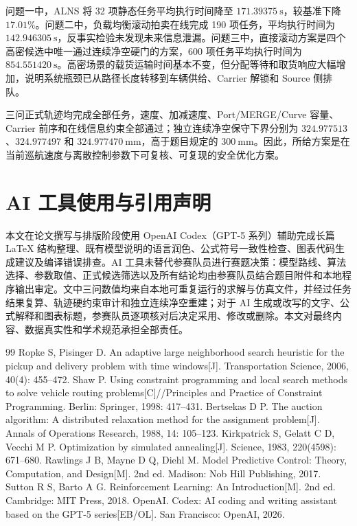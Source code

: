 \documentclass[UTF8]{ctexart}
\begin{document}
问题一中，ALNS 将 32 项静态任务平均执行时间降至 $171.39375\ \mathrm{s}$，较基准下降 $17.01\%$。问题二中，负载均衡滚动拍卖在线完成 190 项任务，平均执行时间为 $142.946305\ \mathrm{s}$，反事实检验未发现未来信息泄漏。问题三中，直接滚动方案是四个高密候选中唯一通过连续净空硬门的方案，600 项任务平均执行时间为 $854.551420\ \mathrm{s}$。高密场景的载货运输时间基本不变，但分配等待和取货响应大幅增加，说明系统瓶颈已从路径长度转移到车辆供给、Carrier 解锁和 Source 侧排队。

三问正式轨迹均完成全部任务，速度、加减速度、Port/MERGE/Curve 容量、Carrier 前序和在线信息约束全部通过；独立连续净空保守下界分别为 $324.977513$、$324.977497$ 和 $324.977470\ \mathrm{mm}$，高于题目规定的 $300\ \mathrm{mm}$。因此，所给方案是在当前巡航速度与离散控制参数下可复核、可复现的安全优化方案。

\section*{AI 工具使用与引用声明}

本文在论文撰写与排版阶段使用 OpenAI Codex（GPT-5 系列）辅助完成长篇 LaTeX 结构整理、既有模型说明的语言润色、公式符号一致性检查、图表代码生成建议及编译错误排查\cite{openai2026}。AI 工具未替代参赛队员进行赛题决策：模型路线、算法选择、参数取值、正式候选筛选以及所有结论均由参赛队员结合题目附件和本地程序输出审定。文中三问数值均来自本地可重复运行的求解与仿真文件，并经过任务结果复算、轨迹硬约束审计和独立连续净空重建；对于 AI 生成或改写的文字、公式解释和图表标题，参赛队员逐项核对后决定采用、修改或删除。本文对最终内容、数据真实性和学术规范承担全部责任。

\begin{thebibliography}{99}
 Ropke S, Pisinger D. An adaptive large neighborhood search heuristic for the pickup and delivery problem with time windows[J]. Transportation Science, 2006, 40(4): 455--472.
 Shaw P. Using constraint programming and local search methods to solve vehicle routing problems[C]//Principles and Practice of Constraint Programming. Berlin: Springer, 1998: 417--431.
 Bertsekas D P. The auction algorithm: A distributed relaxation method for the assignment problem[J]. Annals of Operations Research, 1988, 14: 105--123.
 Kirkpatrick S, Gelatt C D, Vecchi M P. Optimization by simulated annealing[J]. Science, 1983, 220(4598): 671--680.
 Rawlings J B, Mayne D Q, Diehl M. Model Predictive Control: Theory, Computation, and Design[M]. 2nd ed. Madison: Nob Hill Publishing, 2017.
 Sutton R S, Barto A G. Reinforcement Learning: An Introduction[M]. 2nd ed. Cambridge: MIT Press, 2018.
 OpenAI. Codex: AI coding and writing assistant based on the GPT-5 series[EB/OL]. San Francisco: OpenAI, 2026.
\end{thebibliography}
\end{document}
